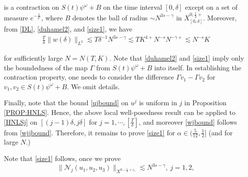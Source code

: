 \documentclass[11pt]{amsart}
\numberwithin{equation}{section} \numberwithin{theorem}{section}
\begin{document}
{
\noindent} is a contraction on $S(t) \psi^\omega + B$ on the time interval $[0, {\delta}]$ except on a set of measure $e^{-\frac{1}{{\delta}^c}}$, where $B$ denotes the ball of radius $\sim N^{3s-{\gamma} }$ in $X^{0, \frac{1}{2}+}_{[0,  {\delta}]}$. Moreover, from \eqref{DL}, \eqref{duhamel2},  and \eqref{size1}, we have 
\begin{align}
	\label{wjjbound} \frac{T}{\delta} \|w({\delta})\|_{L^2} \lesssim T {\delta}^{-1} N^{3s-{\gamma}} \lesssim T K^{4+} N^{-s}N^{ -{\gamma}+ } \lesssim N^{-s}K 
\end{align}

{
\noindent} for sufficiently large $N = N(T, K)$. Note that \eqref{duhamel2} and \eqref{size1} imply only the boundedness of the map ${\Gamma}$ from $S(t) \psi^\omega + B$ into itself. In establishing the contraction property, 
one needs to consider the difference ${\Gamma} v_1 - {\Gamma} v_2$ for $v_1, v_2 \in S(t) \psi^\omega + B$.
We omit details.

Finally, note that the bound \eqref{ujbound} on $u^j$ is uniform in $j$ in Proposition \ref{PROP:HNLS}. 
Hence, the above local well-posedness result can be applied to \eqref{HNLSj} on $[(j - 1){\delta}, j{\delta}]$ for $j = 1, \cdots, [\frac{T}{\delta}]$, and moreover \eqref{wjbound} follows from \eqref{wjjbound}. Therefore, it remains to prove \eqref{size1} for ${\alpha} \in ( \frac{5}{12}, \frac{1}{2}]$ (and for large $N$.)

\medskip

Note that  \eqref{size1} follows, once we prove 
\begin{equation}
	\label{size2} \| \mathcal{N}_j (u_1, u_2, u_3) \|_{X^{0, -\frac{1}{2}+{\varepsilon}_1}} \lesssim N^{3s - {\gamma}}, \ j = 1, 2, 
\end{equation}
\end{document}
